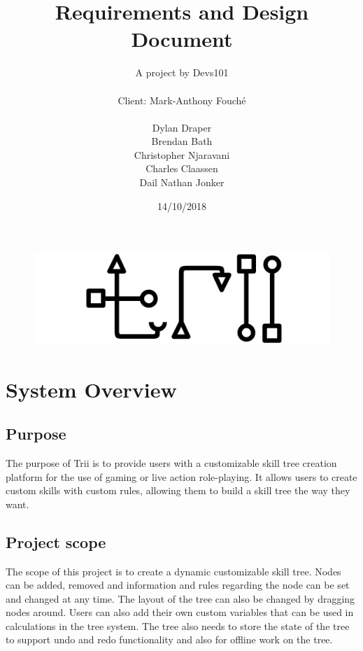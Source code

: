\documentclass[12pt]{article}
\title{Requirements and Design Document}
\author{A project by Devs101\\ \\
Client: Mark-Anthony Fouché\\ \\
Dylan Draper\\
Brendan Bath\\
Christopher Njaravani\\
Charles Claassen\\
Dail Nathan Jonker\\
}
\date{14/10/2018}
\begin{document}
\maketitle
\begin{figure}[H]
	\includegraphics[width=\linewidth]{images/logo.jpg}
	\label{fig:logo}
\end{figure}
\newpage
{}

\tableofcontents
\newpage

\section{System Overview}

  \subsection{Purpose}
  The purpose of Trii is to provide users with a customizable skill tree creation platform for the use of gaming or live action role-playing. It allows users to create custom skills with custom rules, allowing them to build a skill tree the way they want.
  
  \subsection{Project scope}
  The scope of this project is to create a dynamic customizable skill tree. Nodes can be added, removed and information and rules regarding the node can be set and changed at any time.\newline 
  The layout of the tree can also be changed by dragging nodes around.\newline 
  Users can also add their own custom variables that can be used in calculations in the tree system.\newline 
  The tree also needs to store the state of the tree to support undo and redo functionality and also for offline work on the tree.
\end{document}
